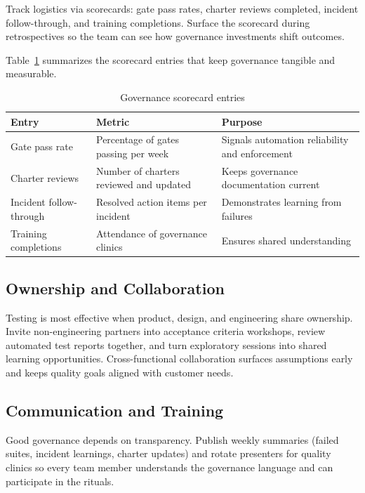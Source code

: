 Track logistics via scorecards: gate pass rates, charter reviews completed, incident follow-through, and training completions. Surface the scorecard during retrospectives so the team can see how governance investments shift outcomes.

Table~\ref{tab:governance-scorecard} summarizes the scorecard entries that keep governance tangible and measurable.

\begin{table}[h]
\centering
\caption{Governance scorecard entries}
\label{tab:governance-scorecard}
\begin{tabular}{p{4cm}p{4cm}p{4cm}}
\toprule
Entry & Metric & Purpose \\
\midrule
Gate pass rate & Percentage of gates passing per week & Signals automation reliability and enforcement \\
Charter reviews & Number of charters reviewed and updated & Keeps governance documentation current \\
Incident follow-through & Resolved action items per incident & Demonstrates learning from failures \\
Training completions & Attendance of governance clinics & Ensures shared understanding \\
\bottomrule
\end{tabular}
\end{table}

\subsection{Ownership and Collaboration}

Testing is most effective when product, design, and engineering share ownership. Invite non-engineering partners into acceptance criteria workshops, review automated test reports together, and turn exploratory sessions into shared learning opportunities. Cross-functional collaboration surfaces assumptions early and keeps quality goals aligned with customer needs.

\subsection{Communication and Training}

Good governance depends on transparency. Publish weekly summaries (failed suites, incident learnings, charter updates) and rotate presenters for quality clinics so every team member understands the governance language and can participate in the rituals.

